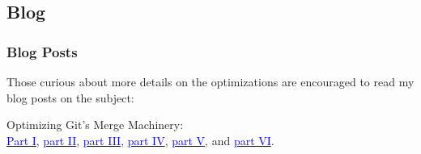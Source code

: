 \documentclass[compress,t]{beamer}
\begin{document}
\subsection{Blog}

\begin{frame}
  \frametitle{Blog Posts}

  Those curious about more details on the optimizations are encouraged
  to read my blog posts on the subject:

  \qquad
  \begin{center}
  Optimizing Git's Merge Machinery:\\ \href{https://blog.palantir.com/optimizing-gits-merge-machinery-1-127ceb0ef2a1}{\textcolor{blue}{Part I}}, 
  \href{https://blog.palantir.com/optimizing-gits-merge-machinery-2-d81391b97878}{\textcolor{blue}{part II}}, 
  \href{https://blog.palantir.com/optimizing-gits-merge-machinery-3-2dc7c7436978}{\textcolor{blue}{part III}}, 
  \href{https://blog.palantir.com/optimizing-gits-merge-machinery-part-iv-5bbc4703d050}{\textcolor{blue}{part IV}}, 
  \href{https://blog.palantir.com/optimizing-gits-merge-machinery-part-v-46ff3710633e}{\textcolor{blue}{part V}}, and
  \href{https://blog.palantir.com/optimizing-gits-merge-machinery-6-7bf887a131d8}{\textcolor{blue}{part VI}}.
  \end{center}

\end{frame}

\end{document}
